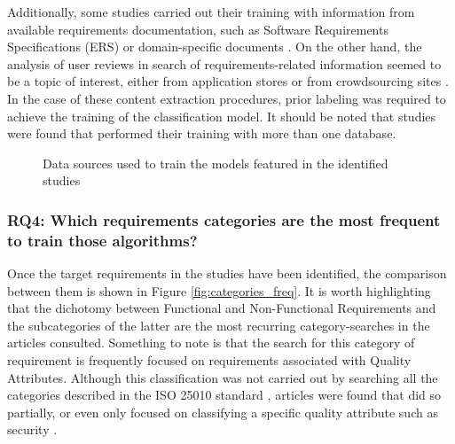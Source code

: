 \documentclass[conference]{IEEEtran}
\begin{document}
Additionally, some studies carried out their training with information from available requirements documentation, such as Software Requirements Specifications (ERS) or domain-specific documents \cite{6779538,6912260}. On the other hand, the analysis of user reviews in search of requirements-related information seemed to be a topic of interest, either from application stores \cite{Taj:2019:ADM:3328833.3328837,LI2018108} or from crowdsourcing sites \cite{Taj:2019:ADM:3328833.3328837,LI2018108}. In the case of these content extraction procedures, prior labeling was required to achieve the training of the classification model. It should be noted that studies were found that performed their training with more than one database.

\begin{figure}[!htbp]
    \caption{\label{fig:training}Data sources used to train the models featured in the identified studies}
\end{figure}

\subsubsection{RQ4: Which requirements categories are the most frequent to train those algorithms?}

Once the target requirements in the studies have been identified, the comparison between them is shown in Figure \ref{fig:categories_freq}. It is worth highlighting that the dichotomy between Functional and Non-Functional Requirements and the subcategories of the latter are the most recurring category-searches in the articles consulted. Something to note is that the search for this category of requirement is frequently focused on requirements associated with Quality Attributes. Although this classification was not carried out by searching all the categories described in the ISO 25010 standard \cite{ISO25010}, articles were found that did so partially, or even only focused on classifying a specific quality attribute such as security \cite{7732349,6912260}.
\end{document}
